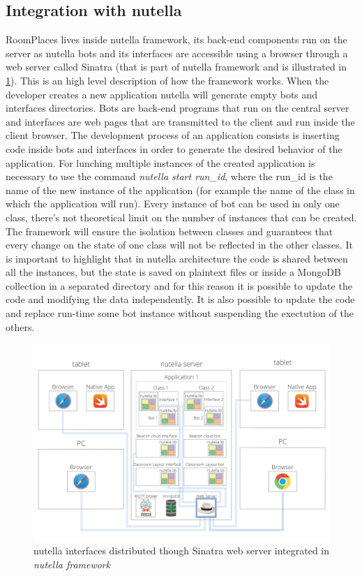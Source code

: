 \subsection{Integration with nutella}
RoomPlaces lives inside nutella framework, its back-end components run on the server as nutella bots and its interfaces are accessible using a browser through a web server called Sinatra (that is part of nutella framework and is illustrated in \ref{fig:nutella_web_server}). This is an high level description of how the framework works. When the developer creates a new application nutella will generate empty bots and interfaces directories. Bots are back-end programs that run on the central server and interfaces are web pages that are transmitted to the client and run inside the client browser. The development  process of an application consists is inserting code inside bots and interfaces in order to generate the desired behavior of the application. For lunching multiple instances of the created application is necessary to use the command \textit{nutella start run\_id}, where the run\_id is the name of the new instance of the application (for example the name of the class in which the application will run). Every instance of bot can be used in only one class, there's not theoretical limit on the number of instances that can be created. The framework will ensure the isolation between classes and guarantees that every change on the state of one class will not be reflected in the other classes. It is important to highlight that in nutella architecture the code is shared between all the instances, but the state is saved on plaintext files or inside a MongoDB collection in a separated directory and for this reason it is possible to update the code and modifying the data independently. It is also possible to update the code and replace run-time some bot instance without suspending the exectution of the others.

\begin{figure}
\centering
\includegraphics[width=6in]{images/nutella-client-server-webserver.png}
\caption{nutella interfaces distributed though Sinatra web server integrated in \textit{nutella framework}}
\label{fig:nutella_web_server}
\end{figure}

